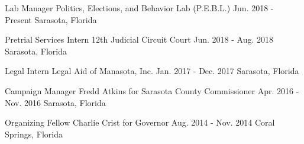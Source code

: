 

\begin{cventries}

  \cventry
    {Lab Manager} %
    {Politics, Elections, and Behavior Lab (P.E.B.L.)} %
    {Jun. 2018 - Present} %
    {Sarasota, Florida} %
    {}

\vspace{-.25cm}
  \cventry
    {Pretrial Services Intern} %
    {12th Judicial Circuit Court} %
    {Jun. 2018 - Aug. 2018} %
    {Sarasota, Florida} %
    {}

\vspace{-.25cm}
  \cventry
    {Legal Intern} %
    {Legal Aid of Manasota, Inc.} %
    {Jan. 2017 - Dec. 2017} %
    {Sarasota, Florida} %
    {}

\vspace{-.25cm}
  \cventry
    {Campaign Manager} %
    {Fredd Atkins for Sarasota County Commissioner} %
    {Apr. 2016 - Nov. 2016} %
    {Sarasota, Florida} %
    {}

\vspace{-.25cm}
  \cventry
    {Organizing Fellow} %
    {Charlie Crist for Governor} %
    {Aug. 2014 - Nov. 2014} %
    {Coral Springs, Florida} %
    {}

\vspace{-.25cm}
\end{cventries}
